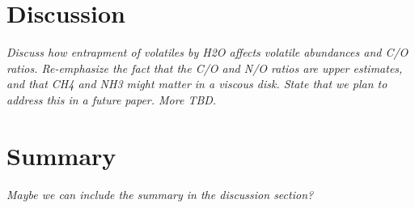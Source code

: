 \documentclass[apj]{emulateapj}
\newcommand{\emgr}[1]{\emph{ \color{gray} #1}}
\begin{document}
\section{Discussion}

\emgr{Discuss how entrapment of volatiles by H2O affects volatile abundances and C/O ratios. Re-emphasize the fact that the C/O and N/O ratios are upper estimates, and that CH4 and NH3 might matter in a viscous disk. State that we plan to address this in a future paper. More TBD.}

\section{Summary}

\emgr{Maybe we can include the summary in the discussion section?}
\end{document}
